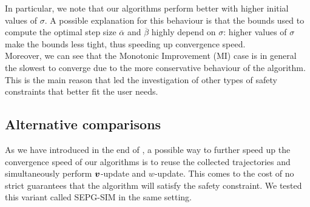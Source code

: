In particular, we note that our algorithms perform better with higher initial values of $\sigma$. A possible explanation for this behaviour is that the bounds used to compute the optimal step size $\overline{\alpha}$ and $\overline{\beta}$ highly depend on $\sigma$: higher values of $\sigma$ make the bounds less tight, thus speeding up convergence speed.\\
Moreover, we can see that the Monotonic Improvement (MI) case is in general the slowest to converge due to the more conservative behaviour of the algorithm. This is the main reason that led the investigation of other types of safety constraints that better fit the user needs.


\begin{table}[t]

\caption{Upper bound confidence intervals at 95\% of $|\vv - \vv^*|$ after 10,000 iterations.}\label{exp:convergence-speed}
\end{table}


\subsection{Alternative comparisons}

As we have introduced in the end of , a possible way to further speed up the convergence speed of our algorithms is to reuse the collected trajectories and simultaneously perform $\boldsymbol{v}$-update and $w$-update. This comes to the cost of no strict guarantees that the algorithm will satisfy the safety constraint. We tested this variant called SEPG-SIM in the same setting.

